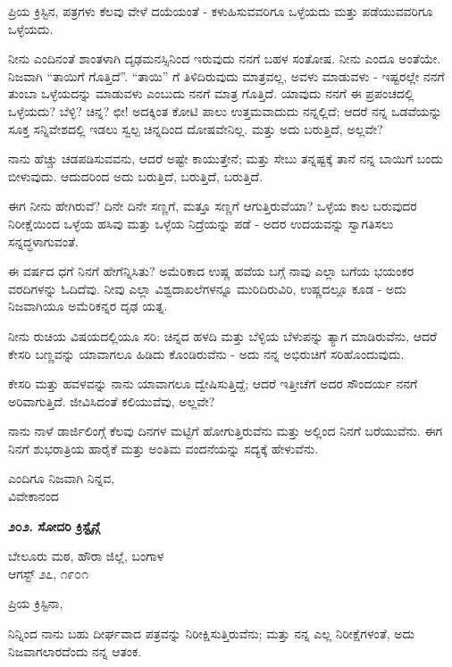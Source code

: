 ಪ್ರಿಯ ಕ್ರಿಸ್ಟಿನ, ಪತ್ರಗಳು ಕೆಲವು ವೇಳೆ ದಯೆಯಂತೆ - ಕಳುಹಿಸುವವರಿಗೂ ಒಳ್ಳೆಯದು ಮತ್ತು ಪಡೆಯುವವರಿಗೂ ಒಳ್ಳೆಯದು.

ನೀನು ಎಂದಿನಂತೆ ಶಾಂತಳಾಗಿ ದೃಢಮನಸ್ಸಿನಿಂದ ಇರುವುದು ನನಗೆ ಬಹಳ ಸಂತೋಷ. ನೀನು ಎಂದೂ ಅಂತೆಯೇ. ನಿಜವಾಗಿ “ತಾಯಿಗೆ ಗೊತ್ತಿದೆ”. “ತಾಯಿ” ಗೆ ತಿಳಿದಿರುವುದು ಮಾತ್ರವಲ್ಲ, ಅವಳು ಮಾಡುವಳು - ಇಷ್ಟರಲ್ಲೇ ನನಗೆ ತುಂಬಾ ಒಳ್ಳೆಯದನ್ನು ಮಾಡುವಳು ಎಂಬುದು ನನಗೆ ಮಾತ್ರ ಗೊತ್ತಿದೆ. ಯಾವುದು ನನಗೆ ಈ ಪ್ರಪಂಚದಲ್ಲಿ ಒಳ್ಳೆಯದು? ಬೆಳ್ಳಿ? ಚಿನ್ನ? ಛೀ! ಅದಕ್ಕಿಂತ ಕೋಟಿ ಪಾಲು ಉತ್ತಮವಾದುದು ನನ್ನಲ್ಲಿದೆ; ಆದರೆ ನನ್ನ ಒಡವೆಯನ್ನು ಸೂಕ್ತ ಸನ್ನಿವೇಶದಲ್ಲಿ ಇಡಲು ಸ್ವಲ್ಪ ಚಿನ್ನದಿಂದ ದೋಷವೇನಿಲ್ಲ. ಮತ್ತು ಅದು ಬರುತ್ತಿದೆ, ಅಲ್ಲವೇ?

ನಾನು ಹೆಚ್ಚು ಚಡಪಡಿಸುವವನು, ಆದರೆ ಅಷ್ಟೇ ಕಾಯುತ್ತೇನೆ; ಮತ್ತು ಸೇಬು ತನ್ನಷ್ಟಕ್ಕೆ ತಾನೆ ನನ್ನ ಬಾಯಿಗೆ ಬಂದು ಬೀಳುವುದು. ಆದುದರಿಂದ ಅದು ಬರುತ್ತಿದೆ, ಬರುತ್ತಿದೆ, ಬರುತ್ತಿದೆ.

ಈಗ ನೀನು ಹೇಗಿರುವೆ? ದಿನೇ ದಿನೇ ಸಣ್ಣಗೆ, ಮತ್ತೂ ಸಣ್ಣಗೆ ಆಗುತ್ತಿರುವೆಯಾ? ಒಳ್ಳೆಯ ಕಾಲ ಬರುವುದರ ನಿರೀಕ್ಷೆಯಿಂದ ಒಳ್ಳೆಯ ಹಸಿವು ಮತ್ತು ಒಳ್ಳೆಯ ನಿದ್ರೆಯನ್ನು ಪಡೆ - ಅದರ ಉದಯವನ್ನು ಸ್ವಾಗತಿಸಲು ಸನ್ನದ್ಧಳಾಗುವಂತೆ.

ಈ ವರ್ಷದ ಧಗೆ ನಿನಗೆ ಹೇಗೆನ್ನಿಸಿತು? ಅಮೆರಿಕಾದ ಉಷ್ಣ ಹವೆಯ ಬಗ್ಗೆ ನಾವು ಎಲ್ಲಾ ಬಗೆಯ ಭಯಂಕರ ವರದಿಗಳನ್ನು ಓದಿದೆವು. ನೀವು ಎಲ್ಲಾ ವಿಶ್ವದಾಖಲೆಗಳನ್ನೂ ಮುರಿದಿರುವಿರಿ, ಉಷ್ಣದಲ್ಲೂ ಕೂಡ - ಅದು ನಿಜವಾಗಿಯೂ ಅಮೆರಿಕನ್ನರ ದೃಢ ಯತ್ನ.

ನೀನು ರುಚಿಯ ವಿಷಯದಲ್ಲಿಯೂ ಸರಿ: ಚಿನ್ನದ ಹಳದಿ ಮತ್ತು ಬೆಳ್ಳಿಯ ಬೆಳುಪನ್ನು ತ್ಯಾಗ ಮಾಡಿರುವೆನು, ಆದರೆ ಕೇಸರಿ ಬಣ್ಣವನ್ನು ಯಾವಾಗಲೂ ಹಿಡಿದು ಕೊಂಡಿರುವೆನು - ಅದು ನನ್ನ ಅಭಿರುಚಿಗೆ ಸರಿಹೊಂದುವುದು.

ಕೇಸರಿ ಮತ್ತು ಹವಳವನ್ನು ನಾನು ಯಾವಾಗಲೂ ದ್ವೇಷಿಸುತ್ತಿದ್ದೆ; ಆದರೆ ಇತ್ತೀಚೆಗೆ ಅದರ ಸೌಂದರ್ಯ ನನಗೆ ಅರಿವಾಗುತ್ತಿದೆ. ಜೀವಿಸಿದಂತೆ ಕಲಿಯುವೆವು, ಅಲ್ಲವೇ?

ನಾನು ನಾಳೆ ಡಾರ್ಜಿಲಿಂಗ್ಗೆ ಕೆಲವು ದಿನಗಳ ಮಟ್ಟಿಗೆ ಹೋಗುತ್ತಿರುವೆನು ಮತ್ತು ಅಲ್ಲಿಂದ ನಿನಗೆ ಬರೆಯುವೆನು. ಈಗ ನಿನಗೆ ಶುಭರಾತ್ರಿಯ ಹಾರೈಕೆ ಮತ್ತು ಅಂತಿಮ ವಂದನೆಯನ್ನು ಸದ್ಯಕ್ಕೆ ಹೇಳುವೆನು.

\begin{flushright}
ಎಂದಿಗೂ ನಿಜವಾಗಿ ನಿನ್ನವ,\\ವಿವೇಕಾನಂದ
\end{flushright}

\begin{center}
\textbf{೨೦೨. ಸೋದರಿ ಕ್ರಿಸ್ಟೈನ್ಗೆ}
\end{center}

\begin{flushright}
ಬೇಲೂರು ಮಠ, ಹೌರಾ ಜಿಲ್ಲೆ, ಬಂಗಾಳ\\ಆಗಸ್ಟ್ ೨೭, ೧೯೦೧
\end{flushright}

ಪ್ರಿಯ ಕ್ರಿಸ್ಟಿನಾ,

ನಿನ್ನಿಂದ ನಾನು ಬಹು ದೀರ್ಘವಾದ ಪತ್ರವನ್ನು ನಿರೀಕ್ಷಿಸುತ್ತಿರುವೆನು; ಮತ್ತು ನನ್ನ ಎಲ್ಲ ನಿರೀಕ್ಷೆಗಳಂತೆ, ಅದು ನಿಜವಾಗಲಾರದೆಂದು ನನ್ನ ಆತಂಕ.

